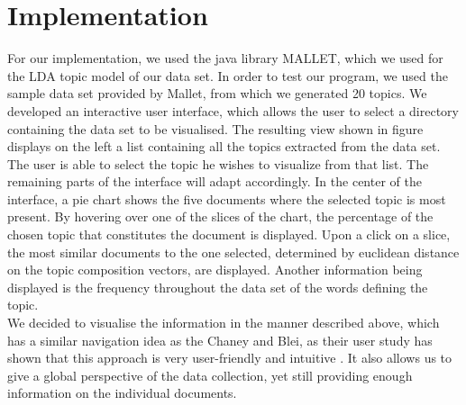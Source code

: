 \documentclass[11pt]{article}
\begin{document}

\section{Implementation}
%

For our implementation, we used the java library MALLET, which we used for the LDA topic model of our data set. In order to test our program, we used the sample data set provided by Mallet, from which we generated 20 topics. We developed an interactive user interface, which allows the user to select a directory containing the data set to be visualised. The resulting view shown in figure displays on the left a list containing all the topics extracted from the data set. The user is able to select the topic he wishes to visualize from that list. The remaining parts of the interface will adapt accordingly. In the center of the interface, a pie chart shows the five documents where the selected topic is most present. By hovering over one of the slices of the chart, the percentage of the chosen topic that constitutes the document is displayed. Upon a click on a slice, the most similar documents to the one selected, determined by euclidean distance on the topic composition vectors, are displayed. Another information being displayed is the frequency throughout the data set of the words defining the topic.\\
We decided to visualise the information in the manner described above, which has a similar navigation idea as the Chaney and Blei, as their user study has shown that this approach is very user-friendly and intuitive \cite{Chaney2012VisualizingTM}. It also allows us to give a global perspective of the data collection, yet still providing enough information on the individual documents.
\end{document}
